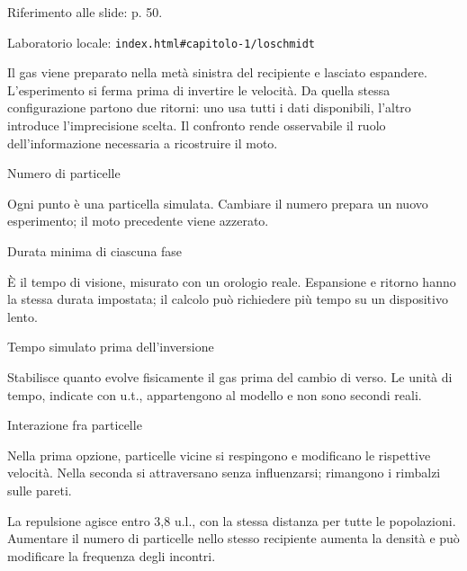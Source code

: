 {\sffamily\small\color{Ink!70} Riferimento alle slide: p. 50.\par}

{\sffamily\small\color{Ink!70} Laboratorio locale: \nolinkurl{index.html#capitolo-1/loschmidt}\par}

Il gas viene preparato nella metà sinistra del recipiente e lasciato espandere. L'esperimento si ferma prima di invertire le velocità. Da quella stessa configurazione partono due ritorni: uno usa tutti i dati disponibili, l'altro introduce l'imprecisione scelta. Il confronto rende osservabile il ruolo dell'informazione necessaria a ricostruire il moto.\par



Numero di particelle\par

Ogni punto è una particella simulata. Cambiare il numero prepara un nuovo esperimento; il moto precedente viene azzerato.\par

Durata minima di ciascuna fase\par

È il tempo di visione, misurato con un orologio reale. Espansione e ritorno hanno la stessa durata impostata; il calcolo può richiedere più tempo su un dispositivo lento.\par

Tempo simulato prima dell'inversione\par

Stabilisce quanto evolve fisicamente il gas prima del cambio di verso. Le unità di tempo, indicate con u.t., appartengono al modello e non sono secondi reali.\par

Interazione fra particelle\par

Nella prima opzione, particelle vicine si respingono e modificano le rispettive velocità. Nella seconda si attraversano senza influenzarsi; rimangono i rimbalzi sulle pareti.\par

La repulsione agisce entro 3,8 u.l., con la stessa distanza per tutte le popolazioni. Aumentare il numero di particelle nello stesso recipiente aumenta la densità e può modificare la frequenza degli incontri.\par

